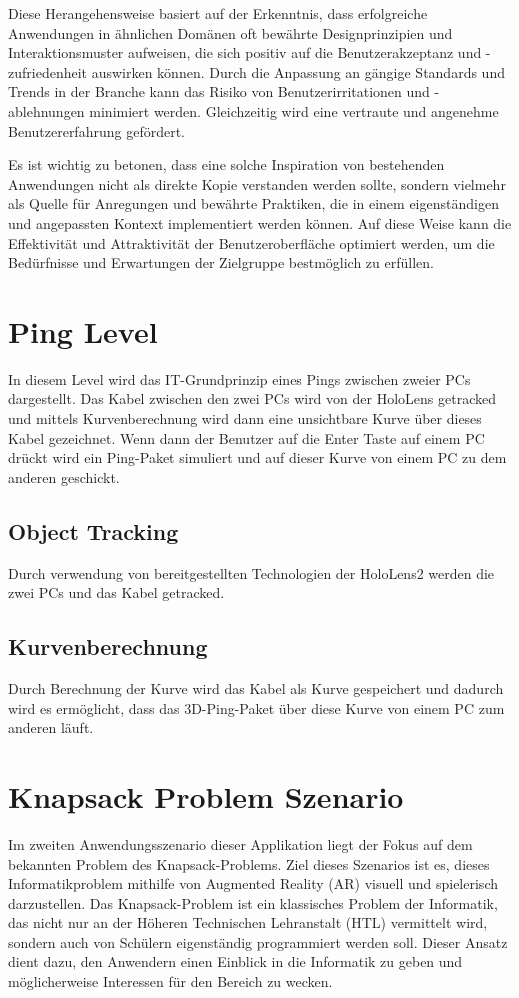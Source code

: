 Diese Herangehensweise basiert auf der Erkenntnis, dass erfolgreiche Anwendungen in ähnlichen Domänen oft bewährte
Designprinzipien und Interaktionsmuster aufweisen, die sich positiv auf die Benutzerakzeptanz und -zufriedenheit auswirken
können. Durch die Anpassung an gängige Standards und Trends in der Branche kann das Risiko von Benutzerirritationen
und -ablehnungen minimiert werden. Gleichzeitig wird eine vertraute und angenehme Benutzererfahrung gefördert.

Es ist wichtig zu betonen, dass eine solche Inspiration von bestehenden Anwendungen nicht als direkte Kopie verstanden
werden sollte, sondern vielmehr als Quelle für Anregungen und bewährte Praktiken, die in einem eigenständigen und angepassten
Kontext implementiert werden können. Auf diese Weise kann die Effektivität und Attraktivität der Benutzeroberfläche
optimiert werden, um die Bedürfnisse und Erwartungen der Zielgruppe bestmöglich zu erfüllen.

\section{Ping Level}
In diesem Level wird das IT-Grundprinzip eines Pings zwischen zweier
PCs dargestellt. Das Kabel zwischen den zwei PCs wird von der
HoloLens getracked und mittels Kurvenberechnung wird dann eine
unsichtbare Kurve über dieses Kabel gezeichnet. Wenn dann der Benutzer
auf die Enter Taste auf einem PC drückt wird ein Ping-Paket simuliert
und auf dieser Kurve von einem PC zu dem anderen geschickt.

\subsection{Object Tracking}
Durch verwendung von bereitgestellten Technologien der HoloLens2
werden die zwei PCs und das Kabel getracked.

\subsection{Kurvenberechnung}
Durch Berechnung der Kurve wird das Kabel als Kurve gespeichert
und dadurch wird es ermöglicht, dass das 3D-Ping-Paket über diese
Kurve von einem PC zum anderen läuft.

\section{Knapsack Problem Szenario}
Im zweiten Anwendungsszenario dieser Applikation liegt der Fokus auf dem bekannten Problem des Knapsack-Problems. Ziel
dieses Szenarios ist es, dieses Informatikproblem mithilfe von Augmented Reality (AR) visuell und spielerisch darzustellen.
Das Knapsack-Problem ist ein klassisches Problem der Informatik, das nicht nur an der Höheren Technischen Lehranstalt (HTL)
vermittelt wird, sondern auch von Schülern eigenständig programmiert werden soll. Dieser Ansatz dient dazu, den Anwendern
einen Einblick in die Informatik zu geben und möglicherweise Interessen für den Bereich zu wecken.

